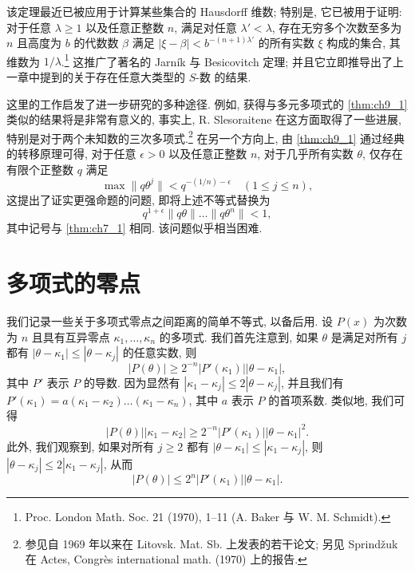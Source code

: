 该定理最近已被应用于计算某些集合的 Hausdorff 维数; 特别是, 它已被用于证明: 对于任意 $\lambda \geq 1$ 以及任意正整数 $n$, 满足对任意 $\lambda' < \lambda$, 存在无穷多个次数至多为 $n$ 且高度为 $b$ 的代数数 $\beta$ 满足 $|\xi - \beta| < b^{-(n+1)\lambda'}$ 的所有实数 $\xi$ 构成的集合, 其维数为 $1/\lambda$.\footnote{Proc. London Math. Soc. 21 (1970), 1--11 (A. Baker 与 W. M. Schmidt).} 这推广了著名的 Jarn\'{i}k 与 Besicovitch 定理; 并且它立即推导出了上一章中提到的关于存在任意大类型的 $S$-数 的结果.

这里的工作启发了进一步研究的多种途径. 例如, 获得与多元多项式的 \autoref{thm:ch9_1} 类似的结果将是非常有意义的, 事实上, R. Slesoraitene 在这方面取得了一些进展, 特别是对于两个未知数的三次多项式.\footnote{参见自 1969 年以来在 Litovsk. Mat. Sb. 上发表的若干论文; 另见 Sprind\v{z}uk 在 Actes, Congr\`{e}s international math. (1970) 上的报告.} 在另一个方向上, 由 \autoref{thm:ch9_1} 通过经典的转移原理可得, 对于任意 $\epsilon > 0$ 以及任意正整数 $n$, 对于几乎所有实数 $\theta$, 仅存在有限个正整数 $q$ 满足
\[\max \|q\theta^j\| < q^{-(1/n)-\epsilon} \quad (1 \leqslant j \leqslant n),\]
这提出了证实更强命题的问题, 即将上述不等式替换为
\[q^{1+\epsilon}\|q\theta\|\ldots\|q\theta^n\|<1,\]
其中记号与 \autoref{thm:ch7_1} 相同. 该问题似乎相当困难.

\section{多项式的零点}\label{sec:ch9_2}

我们记录一些关于多项式零点之间距离的简单不等式, 以备后用. 设 $P(x)$ 为次数为 $n$ 且具有互异零点 $\kappa_1, \ldots, \kappa_n$ 的多项式. 我们首先注意到, 如果 $\theta$ 是满足对所有 $j$ 都有 $|\theta - \kappa_1| \leq |\theta - \kappa_j|$ 的任意实数, 则
\[|P(\theta)| \geqslant 2^{-n} |P'(\kappa_1)| |\theta - \kappa_1|, \tag{1}\label{eq:ch9_1}\]
其中 $P'$ 表示 $P$ 的导数. 因为显然有 $|\kappa_1 - \kappa_j| \leq 2 |\theta - \kappa_j|$, 并且我们有 $P'(\kappa_1) = a(\kappa_1 - \kappa_2) \dots (\kappa_1 - \kappa_n)$, 其中 $a$ 表示 $P$ 的首项系数. 类似地, 我们可得
\[|P(\theta)| |\kappa_1 - \kappa_2| \ge 2^{-n} |P'(\kappa_1)| |\theta - \kappa_1|^2. \tag{2}\label{eq:ch9_2}\]
此外, 我们观察到, 如果对所有 $j \geq 2$ 都有 $|\theta - \kappa_1| \leq |\kappa_1 - \kappa_j|$, 则 $|\theta - \kappa_j| \leq 2|\kappa_1 - \kappa_j|$, 从而
\[|P(\theta)| \leq 2^n |P'(\kappa_1)| |\theta - \kappa_1|. \tag{3}\label{eq:ch9_3}\]

